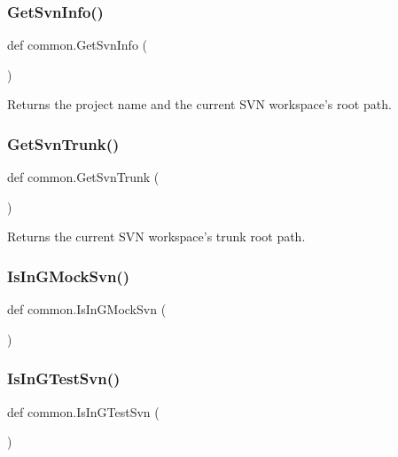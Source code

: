 \subsubsection{\texorpdfstring{GetSvnInfo()}{GetSvnInfo()}}
{\footnotesize\ttfamily def common.\+Get\+Svn\+Info (\begin{DoxyParamCaption}{ }\end{DoxyParamCaption})}

\begin{DoxyVerb}Returns the project name and the current SVN workspace's root path.\end{DoxyVerb}
 \mbox{\label{namespacecommon_a9e6483972a8dc0a6a274cbcee69564b0}} 
\subsubsection{\texorpdfstring{GetSvnTrunk()}{GetSvnTrunk()}}
{\footnotesize\ttfamily def common.\+Get\+Svn\+Trunk (\begin{DoxyParamCaption}{ }\end{DoxyParamCaption})}

\begin{DoxyVerb}Returns the current SVN workspace's trunk root path.\end{DoxyVerb}
 \mbox{\label{namespacecommon_a8219bb529336fc3f0ef8222a5ed48222}} 
\subsubsection{\texorpdfstring{IsInGMockSvn()}{IsInGMockSvn()}}
{\footnotesize\ttfamily def common.\+Is\+In\+G\+Mock\+Svn (\begin{DoxyParamCaption}{ }\end{DoxyParamCaption})}

\mbox{\label{namespacecommon_af29dcab2d7b4a9dd846446a0987ab387}} 
\subsubsection{\texorpdfstring{IsInGTestSvn()}{IsInGTestSvn()}}
{\footnotesize\ttfamily def common.\+Is\+In\+G\+Test\+Svn (\begin{DoxyParamCaption}{ }\end{DoxyParamCaption})}

